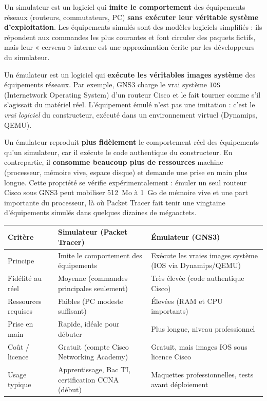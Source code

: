 \documentclass[11pt]{article}
\newcommand{\cle}[1]{{\popxbold\color{popdark}#1}}
\begin{document}
\begin{definition}
Un \cle{simulateur} est un logiciel qui \textbf{imite le comportement} des équipements réseaux (routeurs, commutateurs, PC) \textbf{sans exécuter leur véritable système d'exploitation}. Les équipements simulés sont des modèles logiciels simplifiés : ils répondent aux commandes les plus courantes et font circuler des paquets fictifs, mais leur « cerveau » interne est une approximation écrite par les développeurs du simulateur.
\end{definition}

\begin{definition}
Un \cle{émulateur} est un logiciel qui \textbf{exécute les véritables images système} des équipements réseaux. Par exemple, GNS3 charge le vrai système \texttt{IOS} (Internetwork Operating System) d'un routeur Cisco et le fait tourner comme s'il s'agissait du matériel réel. L'équipement émulé n'est pas une imitation : c'est le \emph{vrai logiciel} du constructeur, exécuté dans un environnement virtuel (Dynamips, QEMU).
\end{definition}

\begin{propriete}
Un émulateur reproduit \textbf{plus fidèlement} le comportement réel des équipements qu'un simulateur, car il exécute le code authentique du constructeur. En contrepartie, il \textbf{consomme beaucoup plus de ressources} machine (processeur, mémoire vive, espace disque) et demande une prise en main plus longue. Cette propriété se vérifie expérimentalement : émuler un seul routeur Cisco sous GNS3 peut mobiliser \SI{512}{Mo} à \SI{1}{Go} de mémoire vive et une part importante du processeur, là où Packet Tracer fait tenir une vingtaine d'équipements simulés dans quelques dizaines de mégaoctets.
\end{propriete}

\begin{center}
\begin{tabularx}{\linewidth}{|l|X|X|}
\hline
\rowcolor{popblueL} \textbf{Critère} & \textbf{Simulateur (Packet Tracer)} & \textbf{Émulateur (GNS3)} \\
\hline
Principe & Imite le comportement des équipements & Exécute les vraies images système (IOS via Dynamips/QEMU) \\
\hline
Fidélité au réel & Moyenne (commandes principales seulement) & Très élevée (code authentique Cisco) \\
\hline
Ressources requises & Faibles (PC modeste suffisant) & Élevées (RAM et CPU importants) \\
\hline
Prise en main & Rapide, idéale pour débuter & Plus longue, niveau professionnel \\
\hline
Coût / licence & Gratuit (compte Cisco Networking Academy) & Gratuit, mais images IOS sous licence Cisco \\
\hline
Usage typique & Apprentissage, Bac TI, certification CCNA (début) & Maquettes professionnelles, tests avant déploiement \\
\hline
\end{tabularx}
\end{center}
\end{document}
